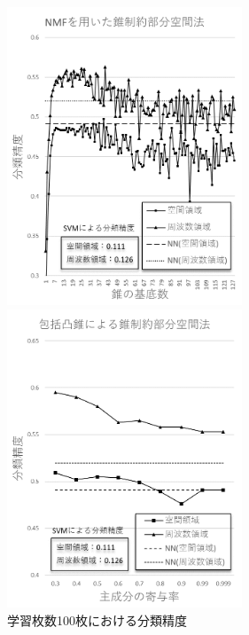 \begin{figure}[htbp]
	\begin{minipage}{0.5\hsize}
		\begin{center}
			\includegraphics[width=70mm]{result/100-nmf.png}
		\end{center}
	\end{minipage}
	\begin{minipage}{0.5\hsize}
		\begin{center}
			\includegraphics[width=70mm]{result/100-comp.png}
		\end{center}
	\end{minipage}
\caption{学習枚数100枚における分類精度}
\label{result_first}
\end{figure}

